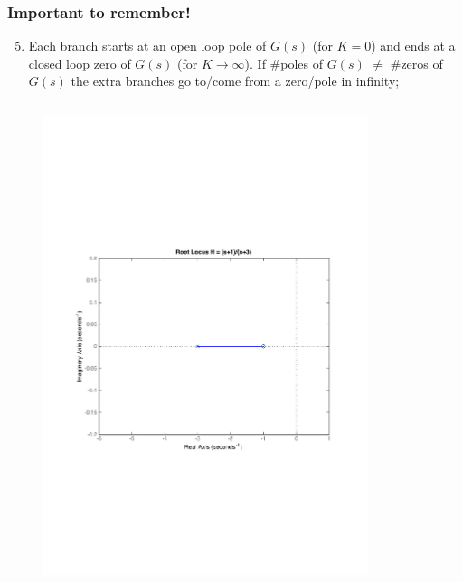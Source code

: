 \begin{frame}
\frametitle{Important to remember!}
	\begin{alertblock}{}
		\begin{enumerate}
		\setcounter{enumi}{4}
			\item Each branch starts at an open loop pole of $G(s)$ (for $K=0$) and ends at a closed loop zero of $G(s)$ (for $K \rightarrow \infty$). If $\#$poles of $G(s)$ $\neq$ $\#$zeros of $G(s)$ the extra branches go to/come from a zero/pole in infinity;
		\end{enumerate}
	\vspace{-1em}
	\begin{columns}
		\begin{column}{0.5\textwidth}
			\begin{figure}
				\centering
				\includegraphics[width=0.8\linewidth]{how_to_draw_easy_ex1}
			\end{figure}
		\end{column}
		\begin{column}{0.5\textwidth}
			\begin{figure}
				\centering

\end{figure}
\end{column}
\end{columns}
\end{alertblock}
\end{frame}
